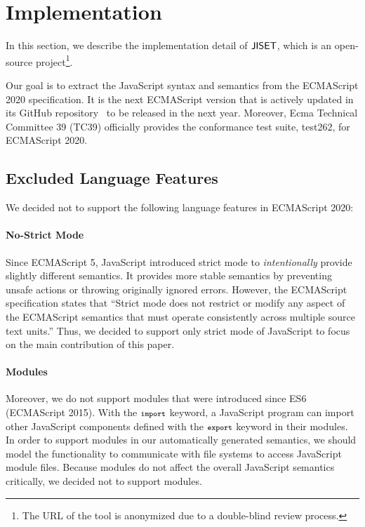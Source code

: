 \section{Implementation}\label{sec:impl}
In this section, we describe the implementation detail of \( \text{\sf JISET} \),
which is an open-source project\footnote{The URL of the tool is anonymized
due to a double-blind review process.}.

Our goal is to extract the JavaScript syntax and semantics from the
ECMAScript 2020 specification.  It is the next ECMAScript version
that is actively updated in its GitHub repository~\cite{es2020}
to be released in the next year.  Moreover, Ecma Technical Committee 39 (TC39)
officially provides the conformance test suite, test262, for ECMAScript 2020.

\subsection{Excluded Language Features}
We decided not to support the following language features in ECMAScript 2020:

\paragraph{No-Strict Mode}
Since ECMAScript 5, JavaScript introduced strict mode to
\textit{intentionally} provide slightly different semantics.  It
provides more stable semantics by preventing unsafe actions or
throwing originally ignored errors.  However, the ECMAScript
specification states that ``Strict mode does not restrict or modify
any aspect of the ECMAScript semantics that must operate consistently
across multiple source text units.''  Thus, we decided to support only
strict mode of JavaScript to focus on the main contribution of this
paper.

\paragraph{Modules}
Moreover, we do not support modules that were introduced since ES6
(ECMAScript 2015).  With the \( \texttt{\footnotesize import} \) keyword, a JavaScript
program can import other JavaScript components defined with the \(
\texttt{\footnotesize export} \) keyword in their modules.  In order to support
modules in our automatically generated semantics, we should model the
functionality to communicate with file systems to access JavaScript
module files.  Because modules do not affect the overall JavaScript
semantics critically, we decided not to support modules.

